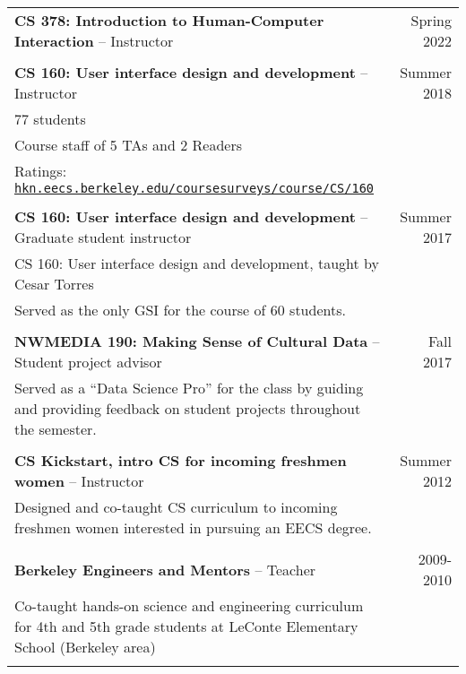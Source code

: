 \begin{longtable}{Xr}
	\textbf{CS 378: Introduction to Human-Computer Interaction} -- Instructor & Spring 2022 \\
	\\

	\textbf{CS 160: User interface design and development} -- Instructor & Summer 2018 \\
	77 students &  \\
	Course staff of 5 TAs and 2 Readers &  \\
	Ratings: \href{https://hkn.eecs.berkeley.edu/coursesurveys/course/CS/160}{\tt hkn.eecs.berkeley.edu/coursesurveys/course/CS/160} &  \\
	\\

	\textbf{CS 160: User interface design and development} -- Graduate student instructor & Summer 2017 \\
	CS 160: User interface design and development, taught by Cesar Torres &  \\
	Served as the only GSI for the course of 60 students. &  \\
	\\

	\textbf{NWMEDIA 190: Making Sense of Cultural Data} -- Student project advisor & Fall 2017 \\
	Served as a “Data Science Pro” for the class by guiding and providing feedback on student projects throughout the semester. &  \\
	\\

	\textbf{CS Kickstart, intro CS for incoming freshmen women} -- Instructor & Summer 2012 \\
	Designed and co-taught CS curriculum to incoming freshmen women interested in pursuing an EECS degree. &  \\
	\\

	\textbf{Berkeley Engineers and Mentors} -- Teacher & 2009-2010 \\
	Co-taught hands-on science and engineering curriculum for 4th and 5th grade students at LeConte Elementary School (Berkeley area) &  \\
	\\

\end{longtable}